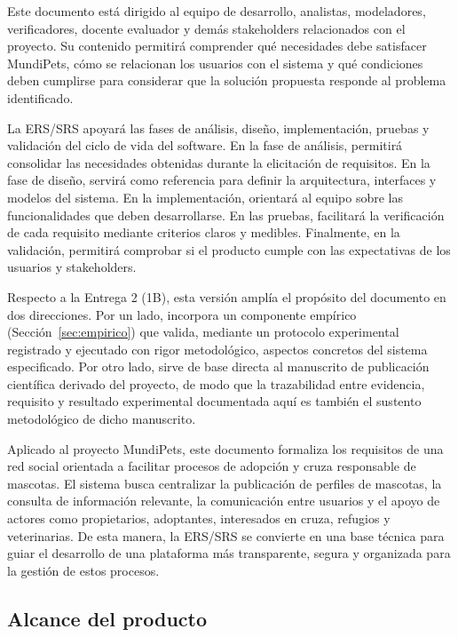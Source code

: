 \documentclass[journal,onecolumn]{IEEEtran}
\begin{document}
	Este documento está dirigido al equipo de desarrollo, analistas, modeladores,
	verificadores, docente evaluador y demás stakeholders relacionados con el
	proyecto. Su contenido permitirá comprender qué necesidades debe satisfacer
	MundiPets, cómo se relacionan los usuarios con el sistema y qué condiciones
	deben cumplirse para considerar que la solución propuesta responde al problema
	identificado.
	
	La ERS/SRS apoyará las fases de análisis, diseño, implementación, pruebas y
	validación del ciclo de vida del software. En la fase de análisis, permitirá
	consolidar las necesidades obtenidas durante la elicitación de requisitos. En
	la fase de diseño, servirá como referencia para definir la arquitectura,
	interfaces y modelos del sistema. En la implementación, orientará al equipo
	sobre las funcionalidades que deben desarrollarse. En las pruebas, facilitará
	la verificación de cada requisito mediante criterios claros y medibles.
	Finalmente, en la validación, permitirá comprobar si el producto cumple con
	las expectativas de los usuarios y stakeholders.
	
	Respecto a la Entrega 2 (1B), esta versión amplía el propósito del documento en
	dos direcciones. Por un lado, incorpora un componente empírico
	(Sección~\ref{sec:empirico}) que valida, mediante un protocolo experimental
	registrado y ejecutado con rigor metodológico, aspectos concretos del sistema
	especificado. Por otro lado, sirve de base directa al manuscrito de
	publicación científica derivado del proyecto, de modo que la trazabilidad
	entre evidencia, requisito y resultado experimental documentada aquí es también
	el sustento metodológico de dicho manuscrito.
	
	Aplicado al proyecto MundiPets, este documento formaliza los requisitos de una
	red social orientada a facilitar procesos de adopción y cruza responsable de
	mascotas. El sistema busca centralizar la publicación de perfiles de mascotas,
	la consulta de información relevante, la comunicación entre usuarios y el
	apoyo de actores como propietarios, adoptantes, interesados en cruza, refugios
	y veterinarias. De esta manera, la ERS/SRS se convierte en una base técnica
	para guiar el desarrollo de una plataforma más transparente, segura y
	organizada para la gestión de estos procesos.
	
	\subsection{Alcance del producto}
	\label{sec:alcance}
	
\end{document}
